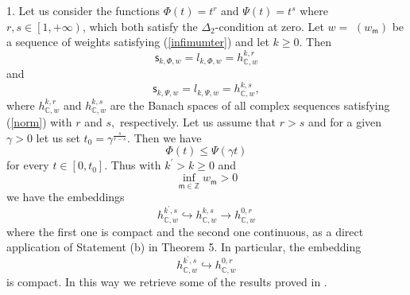 \documentclass{article}
\begin{document}
1. Let us consider the functions $\Phi \left( t\right) =t^{r}$ and $\Psi
(t)=t^{s}$ where $r,s\in \left[ 1,+\infty \right) $, which both satisfy the $%
\Delta _{2}$-condition at zero. Let $w=$ $\left( w_{\mathsf{m}}\right) $ be
a sequence of weights satisfying (\ref{infimumter}) and let $k\geq 0$. Then%
\begin{equation*}
\mathsf{s}_{k,\Phi ,w}=l_{k,\Phi ,w}=h_{\mathbb{C},w}^{k,r}
\end{equation*}%
and%
\begin{equation*}
\mathsf{s}_{k,\Psi ,w}=l_{k,\Psi ,w}=h_{\mathbb{C},w}^{k,s},
\end{equation*}%
where $h_{\mathbb{C},w}^{k,r}$ and $h_{\mathbb{C},w}^{k,s}$ are the Banach
spaces of all complex sequences satisfying (\ref{norm}) with $r$ and $s,$
respectively. Let us assume that $r>s$ and for a given $\gamma >0$ let us
set $t_{0}=\gamma ^{\frac{s}{r-s}}$. Then we have%
\begin{equation*}
\Phi (t)\leq \Psi (\gamma t)
\end{equation*}%
for every $t\in \left[ 0,t_{0}\right] $. Thus with $k^{\prime }>k\geq 0$ and%
\begin{equation*}
\inf_{\mathsf{m\in }\mathbb{Z}}w_{\mathsf{m}}>0
\end{equation*}%
we have the embeddings%
\begin{equation*}
h_{\mathbb{C},w}^{k^{\prime },s}\hookrightarrow h_{\mathbb{C}%
,w}^{k,s}\rightarrow h_{\mathbb{C},w}^{0,r}
\end{equation*}%
where the first one is compact and the second one continuous, as a direct
application of Statement (b) in Theorem 5. In particular, the embedding%
\begin{equation*}
h_{\mathbb{C},w}^{k^{\prime },s}\hookrightarrow h_{\mathbb{C},w}^{0,r}
\end{equation*}%
is compact. In this way we retrieve some of the results proved in \cite%
{vuillermot}.

\bigskip
\end{document}
